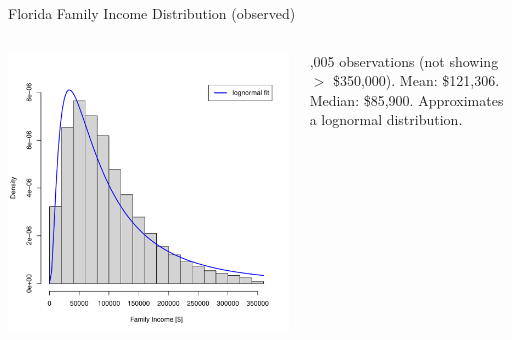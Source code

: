 \begin{frame}{Florida Family Income Distribution (observed)}
    \begin{columns}[c]
        \begin{column}{0.7\textwidth}
            \includegraphics[width=0.9\textheight]{../Figures/IncomeDistribution.pdf}
        \end{column}
        \begin{column}{0.3\textwidth}
            ,005 observations (not showing $>$ \$350,000). 
            \vskip16pt
            Mean: \$121,306. Median: \$85,900. 
            \vskip16pt
            Approximates a lognormal distribution.
        \end{column}
    \end{columns}
\end{frame} 

